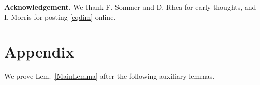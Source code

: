 \documentclass[journal, twocolumn]{IEEEtran}
\newtheorem{lemma}{Lemma}
\begin{document}
\textbf{Acknowledgement.} We thank F. Sommer and D. Rhea for early thoughts, and I. Morris for posting \eqref{eqdim} online.










\section{Appendix}\label{proofs}

We prove Lem.~\ref{MainLemma} after the following auxiliary lemmas.  %


\end{document}
